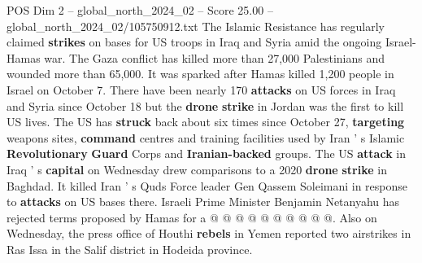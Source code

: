 \begin{textsample}{POS Dim 2 – global\_north\_2024\_02 – Score 25.00 – global\_north\_2024\_02/105750912.txt}
The Islamic Resistance has regularly claimed \textbf{strikes} on bases for US troops in Iraq and Syria amid the ongoing Israel-Hamas war.
The Gaza conflict has killed more than 27,000 Palestinians and wounded more than 65,000.
It was sparked after Hamas killed 1,200 people in Israel on October 7.
There have been nearly 170 \textbf{attacks} on US forces in Iraq and Syria since October 18 but the \textbf{drone} \textbf{strike} in Jordan was the first to kill US lives.
The US has \textbf{struck} back about six times since October 27, \textbf{targeting} weapons sites, \textbf{command} centres and training facilities used by Iran ' s Islamic \textbf{Revolutionary} \textbf{Guard} Corps and \textbf{Iranian-backed} groups.
The US \textbf{attack} in Iraq ' s \textbf{capital} on Wednesday drew comparisons to a 2020 \textbf{drone} \textbf{strike} in Baghdad.
It killed Iran ' s Quds Force leader Gen Qassem Soleimani in response to \textbf{attacks} on US bases there.
Israeli Prime Minister Benjamin Netanyahu has rejected terms proposed by Hamas for a @ @ @ @ @ @ @ @ @ @.
Also on Wednesday, the press office of Houthi \textbf{rebels} in Yemen reported two airstrikes in Ras Issa in the Salif district in Hodeida province.

\end{textsample}
